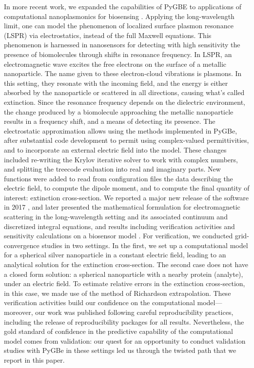 In more recent work, we expanded the capabilities of PyGBE to applications of computational nanoplasmonics for biosensing \cite{ClementiETal2019}. 
Applying the long-wavelength limit, one can model the phenomenon of localized surface plasmon resonance (LSPR) via electrostatics, instead of the full Maxwell equations. 
This phenomenon is harnessed in nanosensors for detecting with high sensitivity the presence of biomolecules through shifts in resonance frequency. 
In LSPR, an electromagnetic wave excites the free electrons on the surface of a metallic nanoparticle. 
The name given to these electron-cloud vibrations is plasmons. 
In this setting, they resonate with the incoming field, and the energy is either absorbed by the nanoparticle or scattered in all directions, causing what's called extinction.
Since the resonance frequency depends on the dielectric environment, the change produced by a biomolecule approaching the metallic nanoparticle results in a frequency shift, and a means of detecting its presence.
The electrostatic approximation allows using the methods implemented in PyGBe, after substantial code development to permit using complex-valued permittivities, and to incorporate an external electric field into the model. 
These changes included re-writing the Krylov iterative solver to work with complex numbers, and splitting the treecode evaluation into real and imaginary parts. 
New functions were added to read from configuration files the data describing the electric field, to compute the dipole moment, and to compute the final quantity of interest: extinction cross-section. 
We reported a major new release of the software in 2017 \cite{ClementiETal2017}, and later  presented the mathematical formulation for electromagnetic scattering in the long-wavelength setting and its associated continuum and discretized integral equations, and results including verification activities and sensitivity calculations on a biosensor model \cite{ClementiETal2019}. 
For verification, we conducted grid-convergence studies in two settings.
In the first, we set up a computational model for a spherical silver nanoparticle in a constant electric field, leading to an analytical solution for the extinction cross-section. 
The second case does not have a closed form solution: a spherical nanoparticle with a nearby protein (analyte), under an electric field. 
To estimate relative errors in the extinction cross-section, in this case, we made use of the method of Richardson extrapolation.
These verification activities build our confidence on the computational model---moreover, our work was published following careful reproducibility practices, including the release of reproducibility packages for all results. 
Nevertheless, the gold standard of confidence in the predictive capability of the computational model comes from validation: our quest for an opportunity to conduct validation studies with PyGBe in these settings led us through the twisted path that we report in this paper.


